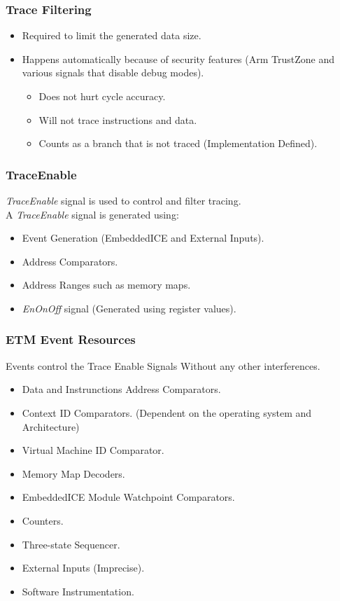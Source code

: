 \documentclass{beamer}
\begin{document}
\begin{frame}
    \frametitle{Trace Filtering}
    \begin{itemize}
        \item Required to limit the generated data size.
        \item Happens automatically because of security features
            (Arm TrustZone and various signals that disable debug modes).
            \begin{itemize}
                \item Does not hurt cycle accuracy.
                \item Will not trace instructions and data.
                \item Counts as a branch that is not traced
                    (Implementation Defined).
            \end{itemize}
    \end{itemize}
\end{frame}

\begin{frame}
    \frametitle{TraceEnable}
    \textit{TraceEnable} signal is used to control and filter tracing. \\
    A \textit{TraceEnable} signal is generated using:
    \begin{itemize}
        \item Event Generation (EmbeddedICE and External Inputs).
        \item Address Comparators.
        \item Address Ranges such as memory maps.
        \item \textit{EnOnOff} signal (Generated using register values).
    \end{itemize}
\end{frame}

\begin{frame}
    \frametitle{ETM Event Resources}
    Events control the Trace Enable Signals Without any other interferences.
    \begin{itemize}
        \item Data and Instrunctions Address Comparators.
        \item Context ID Comparators. (Dependent on the operating system and Architecture)
        \item Virtual Machine ID Comparator.
        \item Memory Map Decoders.
        \item EmbeddedICE Module Watchpoint Comparators.
        \item Counters.
        \item Three-state Sequencer.
        \item External Inputs (Imprecise).
        \item Software Instrumentation.
    \end{itemize}
\end{frame}
\end{document}
